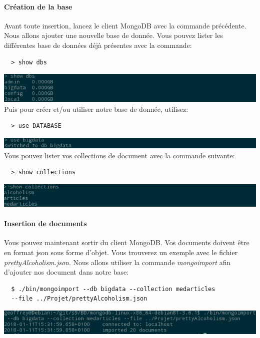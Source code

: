 \documentclass{article}
\begin{document}
  \paragraph{Création de la base} Avant toute insertion, lancez le client MongoDB
  avec la commande précédente. Nous allons ajouter une nouvelle base de donnée. 
  Vous pouvez lister les différentes base de données déjà présentes avec la commande:
  \begin{lstlisting}
  > show dbs
  \end{lstlisting}
  \includegraphics[scale=0.8]{mongodb/show_dbs.png}\\
  Puis pour créer et/ou utiliser notre base de donnée, utilisez:
  \begin{lstlisting}
  > use DATABASE
  \end{lstlisting}
  \includegraphics[scale=0.8]{mongodb/use_dbname.png}\\
  Vous pouvez lister vos collections de document avec la commande suivante:
  \begin{lstlisting}
  > show collections
  \end{lstlisting}
  \includegraphics[scale=0.8]{mongodb/show_collections.png}\\
  
  \paragraph{Insertion de documents}
  Vous pouvez maintenant sortir du client MongoDB. Vos documents doivent être en
  format json sous forme d'objet. Vous trouverez un exemple avec le fichier 
  \emph{prettyAlcoholism.json}. Nous allons utiliser la commande
  \emph{mongoimport} afin d'ajouter nos document dans notre base:
  \begin{lstlisting}
  $ ./bin/mongoimport --db bigdata --collection medarticles 
  --file ../Projet/prettyAlcoholism.json
  \end{lstlisting}
  \includegraphics[scale=0.8]{mongodb/insertiondedoc2.png}\\
\end{document}
